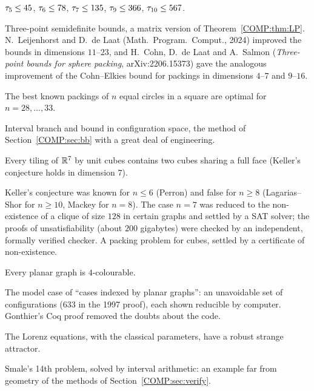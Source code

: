 \begin{theorem}
$\tau_5\le45$, $\tau_6\le78$, $\tau_7\le135$, $\tau_9\le366$, $\tau_{10}\le567$.
\end{theorem}
\noindent Three-point semidefinite bounds, a matrix version of Theorem~\ref{COMP:thm:LP}. N.~Leijenhorst and
D.~de Laat (Math.\ Program.\ Comput., 2024) improved the bounds in dimensions $11$--$23$, and
H.~Cohn, D.~de Laat and A.~Salmon (\emph{Three-point bounds for sphere packing}, arXiv:2206.15373) gave the
analogous improvement of the Cohn--Elkies bound for packings in dimensions $4$--$7$ and $9$--$16$.

\begin{theorem}
The best known packings of $n$ equal circles in a square are optimal for $n=28,\dots,33$.
\end{theorem}
\noindent Interval branch and bound in configuration space, the method of Section~\ref{COMP:sec:bb} with a
great deal of engineering.

\begin{theorem}
Every tiling of $\mathbb{R}^7$ by unit cubes contains two cubes sharing a full face (Keller's conjecture holds in
dimension $7$).
\end{theorem}
\noindent Keller's conjecture was known for $n\le6$ (Perron) and false for $n\ge8$ (Lagarias--Shor for $n\ge10$, Mackey
for $n=8$). The case $n=7$ was reduced to the non-existence of a clique of size $128$ in certain graphs and settled by
a SAT solver; the proofs of unsatisfiability (about $200$ gigabytes) were checked by an independent, formally
verified checker. A packing problem for cubes, settled by a certificate of non-existence.

\begin{theorem}
Every planar graph is $4$-colourable.
\end{theorem}
\noindent The model case of ``cases indexed by planar graphs'': an unavoidable set of configurations ($633$ in the
1997 proof), each shown reducible by computer. Gonthier's Coq proof removed the doubts about the code.

\begin{theorem}
The Lorenz equations, with the classical parameters, have a robust strange attractor.
\end{theorem}
\noindent Smale's 14th problem, solved by interval arithmetic: an example far from geometry of the methods of
Section~\ref{COMP:sec:verify}.

